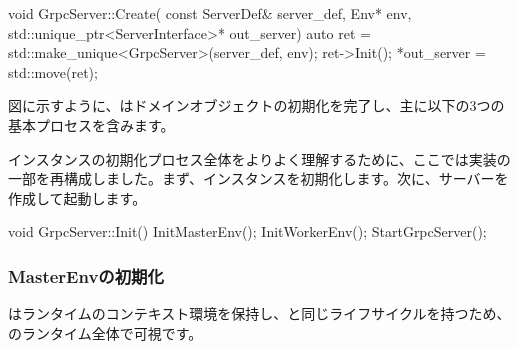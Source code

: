\begin{content}
\begin{leftbar}
\begin{c++}
void GrpcServer::Create(
    const ServerDef& server_def, Env* env,
    std::unique_ptr<ServerInterface>* out_server) {
  auto ret = std::make_unique<GrpcServer>(server_def, env);
  ret->Init();
  *out_server = std::move(ret);
}
\end{c++}
\end{leftbar}

図に示すように、はドメインオブジェクトの初期化を完了し、主に以下の3つの基本プロセスを含みます。

\begin{enum}
    \begin{enum}
    \begin{nitemize}
    \end{nitemize}
    \begin{nitemize}          
    \end{nitemize}      
    \end{enum}
\end{enum}

インスタンスの初期化プロセス全体をよりよく理解するために、ここでは実装の一部を再構成しました。まず、インスタンスを初期化します。次に、サーバーを作成して起動します。

\begin{leftbar}
\begin{c++}
void GrpcServer::Init() {
  InitMasterEnv();
  InitWorkerEnv();
  StartGrpcServer();
}
\end{c++}
\end{leftbar}

\subsubsection{MasterEnvの初期化}

はランタイムのコンテキスト環境を保持し、と同じライフサイクルを持つため、のランタイム全体で可視です。


\end{content}
